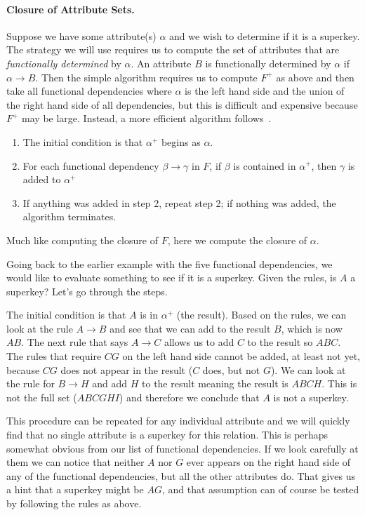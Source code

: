 \paragraph{Closure of Attribute Sets.} Suppose we have some attribute(s) $\alpha$ and we wish to determine if it is a superkey. The strategy we will use requires us to compute the set of attributes that are \textit{functionally determined} by $\alpha$. An attribute $B$ is functionally determined by $\alpha$ if $\alpha \rightarrow B$. Then the  simple algorithm requires us to compute $F^{+}$ as above and then take all functional dependencies where $\alpha$ is the left hand side and the union of the right hand side of all dependencies, but this is difficult and expensive because $F^{+}$ may be large. Instead, a more efficient algorithm follows~\cite{dsc}.

\begin{enumerate}
	\item The initial condition is that $\alpha^{+}$ begins as $\alpha$.
	\item For each functional dependency $\beta \rightarrow \gamma$ in $F$,
		if $\beta$ is contained in $\alpha^{+}$, then $\gamma$ is added to $\alpha^{+}$
	\item If anything was added in step 2, repeat step 2; if nothing was added, the algorithm terminates.
\end{enumerate}

Much like computing the closure of $F$, here we compute the closure of $\alpha$. 

Going back to the earlier example with the five functional dependencies, we would like to evaluate something to see if it is a superkey. Given the rules, is $A$ a superkey? Let's go through the steps. 

The initial condition is that $A$ is in $\alpha^{+}$ (the result). Based on the rules, we can look at the rule $A \rightarrow B$ and see that we can add to the result $B$, which is now $AB$. The next rule that says $A \rightarrow C$ allows us to add $C$ to the result so $ABC$. The rules that require $CG$ on the left hand side cannot be added, at least not yet, because $CG$ does not appear in the result ($C$ does, but not $G$). We can look at the rule for $B \rightarrow H$ and add $H$ to the result meaning the result is $ABCH$. This is not the full set ($ABCGHI$) and therefore we conclude that $A$ is not a superkey.

This procedure can be repeated for any individual attribute and we will quickly find that no single attribute is a superkey for this relation. This is perhaps somewhat obvious from our list of functional dependencies. If we look carefully at them we can notice that neither $A$ nor $G$ ever appears on the right hand side of any of the functional dependencies, but all the other attributes do. That gives us a hint that a superkey might be $AG$, and that assumption can of course be tested by following the rules as above.

